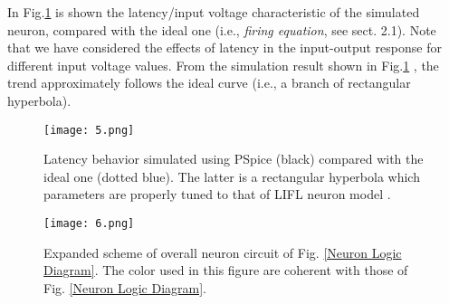 \documentclass[review]{elsarticle}
\begin{document}
In Fig.\ref{Latency comparison} is shown the latency/input voltage characteristic of the simulated neuron, compared with the ideal one (i.e., \emph{firing equation}, see sect. 2.1). Note that we have considered the effects of latency in the input-output response for different input voltage values. From the simulation result shown in Fig.\ref{Latency comparison} , the trend approximately follows the ideal curve (i.e., a branch of rectangular hyperbola).


\begin{figure}[!htbp]
\centering
\texttt{[image: 5.png]}
\caption{Latency behavior simulated using PSpice (black) compared with the ideal one (dotted blue). The latter is a rectangular hyperbola which parameters are properly tuned to that of LIFL neuron model \cite{Cardarilli2013}. }
\label{Latency comparison}
\end{figure}


\begin{figure}[!htbp]
\centering
\texttt{[image: 6.png]}
\caption{Expanded scheme of overall neuron circuit of Fig. \ref{Neuron Logic Diagram}. The color used in this figure are coherent with those of Fig. \ref{Neuron Logic Diagram}.  }
\label{Neuron}
\end{figure}
\end{document}
